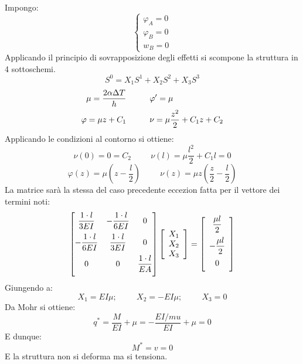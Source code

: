 \documentclass{article}
\begin{document}
\begin{adjustwidth}{2in}{}
		Impongo: 
		\[
		\begin{cases}
			\varphi_A = 0 \\
			\varphi_B = 0 \\
			w_B = 0
		\end{cases}
		\]
		Applicando il principio di sovrapposizione degli effetti si scompone la struttura in 4 sottoschemi. 
		\[ 	S^0 = X_1S^1 + X_2S^2 + X_3S^3\]
		\[ \begin{aligned}
				\mu = \dfrac{2\alpha\Delta T}{h} \hspace{1cm} & \varphi' = \mu \vspace{0.2cm} \\
			\varphi = \mu z + C_1 \hspace{1cm} & \nu = \mu\dfrac{z^2}{2} + C_1 z + C_2 \vspace{0.2cm} \\
		\end{aligned}
		\]
		Applicando le condizioni al contorno si ottiene: 
		\[ \nu(0) = 0 = C_2 \hspace{1cm} \nu(l) = \mu \dfrac{l^2}{2} + C_1l = 0\]
		\[ \varphi(z) = \mu\left( z-\dfrac{l}{2}\right) \hspace{1cm} \nu(z) = \mu z\left( \dfrac{z}{2}-\dfrac{l}{2}\right) \] 
		La matrice sarà la stessa del caso precedente eccezion fatta per il vettore dei termini noti:
		\[\left[ \begin{matrix}
			\dfrac{1\cdot l}{3EI} & -\dfrac{1\cdot l}{6EI} & 0 \vspace{0.2cm} \\
			-\dfrac{1\cdot l}{6EI} & \dfrac{1\cdot l}{3EI} & 0 \vspace{0.2cm} \\
			0 & 0 & \dfrac{1\cdot l}{EA} \vspace{0.2cm}
		\end{matrix}\right] \left[ \begin{array}{c}
			X_1 \\
			X_2 \\
			X_3
		\end{array}\right]  = \left[ \begin{array}{c}
			\dfrac{\mu l}{2} \vspace{0.2cm} \\
			- \dfrac{\mu l}{2}\vspace{0.2cm}  \\
			0 \vspace{0.2cm}  \end{array} \right]
		\]
		Giungendo a:
		\[ X_1 = EI\mu; \hspace{1cm} X_2 = -EI\mu; \hspace{1cm} X_3 = 0\]
		Da Mohr si ottiene: 
		\[q^* = \dfrac{M}{EI} + \mu = - \dfrac{EI/mu}{EI} + \mu = 0\]
		E dunque: 	
		\[M^* = v = 0\]	
		E la struttura non si deforma ma si tensiona.
		

\end{adjustwidth}
\end{document}

